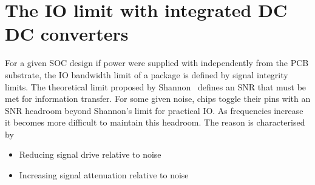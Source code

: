\documentclass[letterpaper,twocolumn,10pt]{article}
\begin{document}

\section{The IO limit with integrated DC DC converters}

For a given SOC design if power were supplied with independently from the PCB substrate, the IO bandwidth limit of a package is defined by signal integrity limits. The theoretical limit proposed by Shannon~\cite{Shannon1948} defines an SNR that must be met for information transfer. For some given noise, chips toggle their pins with an SNR headroom beyond Shannon's limit for practical IO. As frequencies increase it becomes more difficult to maintain this headroom. The reason is characterised by 
\begin{itemize}
\item Reducing signal drive relative to noise
\item Increasing signal attenuation relative to noise
\end{itemize}
\end{document}
